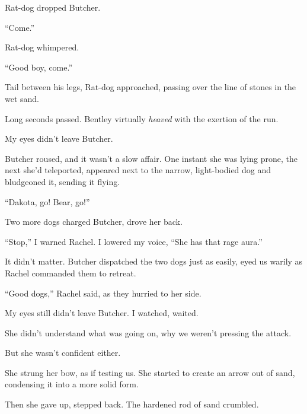 Rat-dog dropped Butcher.



``Come.''



Rat-dog whimpered.



``Good boy, come.''



Tail between his legs, Rat-dog approached, passing over the line of stones in the wet sand.



Long seconds passed.  Bentley virtually \emph{heaved} with the exertion of the run.



My eyes didn't leave Butcher.



Butcher roused, and it wasn't a slow affair.  One instant she was lying prone, the next she'd teleported, appeared next to the narrow, light-bodied dog and bludgeoned it, sending it flying.



``Dakota, go!  Bear, go!''



Two more dogs charged Butcher, drove her back.



``Stop,'' I warned Rachel.  I lowered my voice, ``She has that rage aura.''



It didn't matter.  Butcher dispatched the two dogs just as easily, eyed us warily as Rachel commanded them to retreat.



``Good dogs,'' Rachel said, as they hurried to her side.



My eyes still didn't leave Butcher.  I watched, waited.



She didn't understand what was going on, why we weren't pressing the attack.



But she wasn't confident either.



She strung her bow, as if testing us.  She started to create an arrow out of sand, condensing it into a more solid form.



Then she gave up, stepped back.  The hardened rod of sand crumbled.



